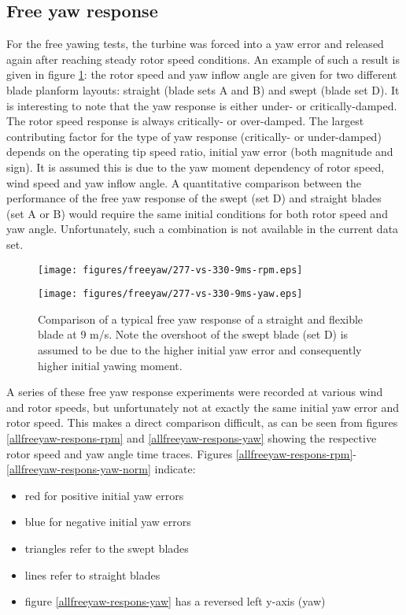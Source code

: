 \documentclass[a4paper]{jpconf}
\begin{document}
\subsection{Free yaw response}

For the free yawing tests, the turbine was forced into a yaw error and released again after reaching steady rotor speed conditions. An example of such a result is given in figure \ref{freeyaw-flex-vs-samo}: the rotor speed and yaw inflow angle are given for two different blade planform layouts: straight (blade sets A and B) and swept (blade set D). It is interesting to note that the yaw response is either under- or critically-damped. The rotor speed response is always critically- or over-damped. The largest contributing factor for the type of yaw response (critically- or under-damped) depends on the operating tip speed ratio, initial yaw error (both magnitude and sign). It is assumed this is due to the yaw moment dependency of rotor speed, wind speed and yaw inflow angle. A quantitative comparison between the performance of the free yaw response of the swept (set D) and straight blades (set A or B) would require the same initial conditions for both rotor speed and yaw angle. Unfortunately, such a combination is not available in the current data set.

\begin{figure}[h]
\centering
\begin{minipage}{\textwidth}
\centering
\texttt{[image: figures/freeyaw/277-vs-330-9ms-rpm.eps]}
\end{minipage}
\begin{minipage}{\textwidth}
\centering
\texttt{[image: figures/freeyaw/277-vs-330-9ms-yaw.eps]}
\caption{\label{freeyaw-flex-vs-samo} Comparison of a typical free yaw response of a straight and flexible blade at 9 m/s. Note the overshoot of the swept blade (set D) is assumed to be due to the higher initial yaw error and consequently higher initial yawing moment.}
\end{minipage} 
\end{figure}

A series of these free yaw response experiments were recorded at various wind and rotor speeds, but unfortunately not at exactly the same initial yaw error and rotor speed. This makes a direct comparison difficult, as can be seen from figures \ref{allfreeyaw-respons-rpm} and \ref{allfreeyaw-respons-yaw} showing the respective rotor speed and yaw angle time traces. Figures \ref{allfreeyaw-respons-rpm}-\ref{allfreeyaw-respons-yaw-norm} indicate:
\begin{itemize}
	\item red for positive initial yaw errors
	\item blue for negative initial yaw errors
	\item triangles refer to the swept blades
	\item lines refer to straight blades
	\item figure \ref{allfreeyaw-respons-yaw} has a reversed left y-axis (yaw)
\end{itemize}
\end{document}
